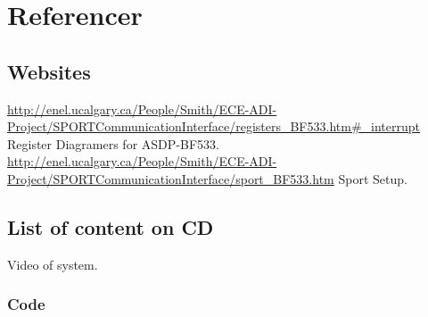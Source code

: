 \chapter{Referencer}
\section{Websites}
\url{http://enel.ucalgary.ca/People/Smith/ECE-ADI-Project/SPORTCommunicationInterface/registers_BF533.htm#_interrupt}
Register Diagramers for ASDP-BF533.\\
\url{http://enel.ucalgary.ca/People/Smith/ECE-ADI-Project/SPORTCommunicationInterface/sport_BF533.htm}
Sport Setup.\\

\section{List of content on CD}
Video of system.

\subsection{Code}
